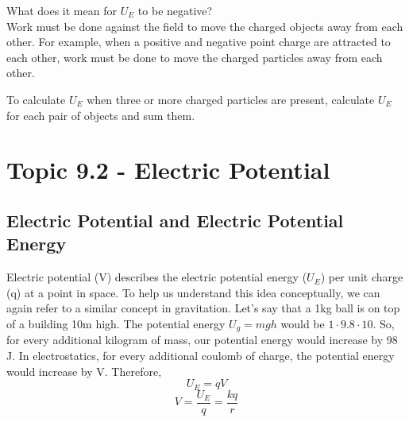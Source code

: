 \documentclass[12pt, titlepage]{article}
\begin{document}
What does it mean for $U_E$ to be negative? \\
Work must be done against the field to move the charged objects away from each other. For example, when a positive and negative point charge are attracted to each other, work must be done to move the charged particles away from each other.

To calculate $U_E$ when three or more charged particles are present, calculate $U_E$ for each pair of objects and sum them. 

\section*{Topic 9.2 - Electric Potential}
\subsection*{Electric Potential and Electric Potential Energy}
Electric potential (V) describes the electric potential energy ($U_E$) per unit charge (q) at a point in space. To help us understand this idea conceptually, we can again refer to a similar concept in gravitation. Let's say that a 1kg ball is on top of a building 10m high. The potential energy $ U_g = mgh$ would be $1 \cdot 9.8 \cdot 10$. So, for every additional kilogram of mass, our potential energy would increase by 98 J. In electrostatics, for every additional coulomb of charge, the potential energy would increase by V. Therefore,
\begin{equation*}
    U_E = qV
\end{equation*}
\begin{equation*}
    V = \frac{U_E}{q} = \frac{kq}{r}
\end{equation*}
\end{document}

